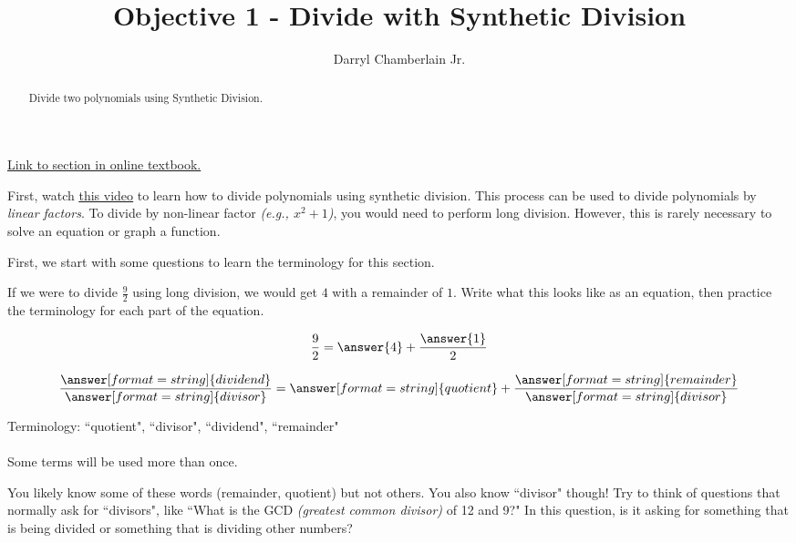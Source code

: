 \documentclass{ximera}
\author{Darryl Chamberlain Jr.}
\title{Objective 1 - Divide with Synthetic Division}
\begin{document}
\begin{abstract}
Divide two polynomials using Synthetic Division.
\end{abstract}
\maketitle
 
\href{https://cnx.org/contents/mwjClAV_@8.1:EfK9BY7_@13/Dividing-Polynomials}{Link to section in online textbook.}
 
 
First, watch
\underline{\href{https://mediasite.video.ufl.edu/Mediasite/Play/0397977141d7448e967c5224b069d4731d}{this video}} to learn how to divide polynomials using synthetic division. This process can be used to divide polynomials by \textit{linear factors}. To divide by non-linear factor \textit{(e.g., $x^2+1$)}, you would need to perform long division. However, this is rarely necessary to solve an equation or graph a function.
 
\begin{question}
First, we start with some questions to learn the terminology for this section.
 
If we were to divide $\frac{9}{2}$ using long division, we would get $4$ with a remainder of $1$. Write what this looks like as an equation, then practice the terminology for each part of the equation.
 
$$\frac{9}{2} = \answer{4} + \frac{\answer{1}}{2}$$
 
$$\frac{\answer[format=string]{dividend}}{\answer[format=string]{divisor}} = \answer[format=string]{quotient} + \frac{\answer[format=string]{remainder}}{\answer[format=string]{divisor}} $$
 
\begin{feedback}
Terminology: ``quotient", ``divisor", ``dividend", ``remainder" \\ \\
Some terms will be used more than once.
\end{feedback}
 
\begin{hint}
You likely know some of these words (remainder, quotient) but not others. You also know ``divisor" though! Try to think of questions that normally ask for ``divisors", like ``What is the GCD \textit{(greatest common divisor)} of 12 and 9?" In this question, is it asking for something that is being divided or something that is dividing other numbers?
\end{hint}
 
\end{question}
 
\end{document}
